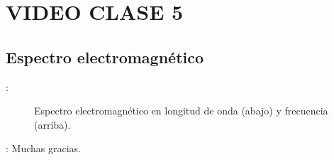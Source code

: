 \section{VIDEO CLASE 5}
\subsection{Espectro electromagnético}
\begin{frame}{\secname : \subsecname}
  \begin{figure}
    \centering
    \caption{Espectro electromagnético en longitud de onda (abajo) y frecuencia (arriba).}
    \label{}
  \end{figure}
\end{frame}


\begin{frame}{\secname : \subsecname}
Muchas gracias.
\end{frame}
